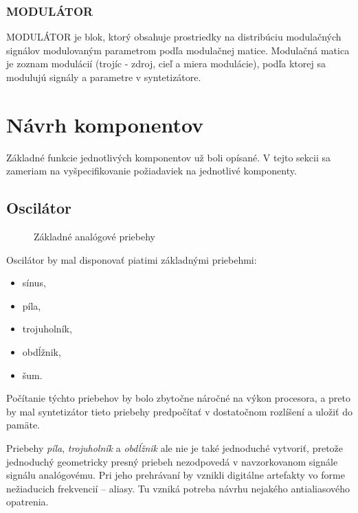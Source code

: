 \subsubsection*{MODULÁTOR}

MODULÁTOR je blok, ktorý obsahuje prostriedky na distribúciu modulačných signálov modulovaným parametrom podľa modulačnej matice. Modulačná matica je zoznam modulácií (trojíc - zdroj, cieľ a miera modulácie), podľa ktorej sa modulujú signály a parametre v syntetizátore.

\section{Návrh komponentov}
Základné funkcie jednotlivých komponentov už boli opísané. V tejto sekcii sa zameriam na vyšpecifikovanie požiadaviek na jednotlivé komponenty.

\subsection{Oscilátor}
\begin{figure}[h]
\centering
{}
\caption{\label{obr12} Základné analógové priebehy}
\end{figure}

Oscilátor by mal disponovať piatimi základnými priebehmi:
\begin{itemize}
\setlength{\itemsep}{-0.5ex}
\item sínus,
\item píla,
\item trojuholník,
\item obdĺžnik,
\item šum.
\end{itemize}

Počítanie týchto priebehov by bolo zbytočne náročné na výkon procesora, a preto by mal syntetizátor tieto priebehy predpočítať v dostatočnom rozlíšení a uložiť do pamäte.

Priebehy \emph{píla}, \emph{trojuholník} a \emph{obdĺžnik} ale nie je také jednoduché vytvoriť, pretože jednoduchý geometricky presný priebeh nezodpovedá v navzorkovanom signále signálu analógovému. Pri jeho prehrávaní by vznikli digitálne artefakty vo forme nežiaducich frekvencií -- aliasy. Tu vzniká potreba návrhu nejakého antialiasového opatrenia. 

